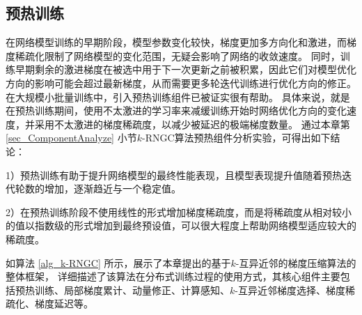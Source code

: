 \documentclass{xdupgthesis}
\begin{document}
\subsection{预热训练}
在网络模型训练的早期阶段，模型参数变化较快，梯度更加多方向化和激进，而梯度稀疏化限制了网络模型的变化范围，无疑会影响了网络的收敛速度。
同时，训练早期剩余的激进梯度在被选中用于下一次更新之前被积累，因此它们对模型优化方向的影响可能会超过最新梯度，从而需要更多轮迭代训练进行优化方向的修正。
在大规模小批量训练中，引入预热训练组件已被证实很有帮助\cite{goyal2017accurate}。
具体来说，就是在预热训练期间，使用不太激进的学习率来减缓训练开始时网络优化方向的变化速度，并采用不太激进的梯度稀疏度，以减少被延迟的极端梯度数量。
通过本章第 \ref{sec_ComponentAnalyze} 小节$k$-RNGC算法预热组件分析实验，可得出如下结论：

1）预热训练有助于提升网络模型的最终性能表现，且模型表现提升值随着预热迭代轮数的增加，逐渐趋近与一个稳定值。

2）在预热训练阶段不使用线性的形式增加梯度稀疏度，而是将稀疏度从相对较小的值以指数级的形式增加到最终预设值，可以很大程度上帮助网络模型适应较大的稀疏度。

如算法 \ref*{alg_k-RNGC} 所示，展示了本章提出的基于$k$-互异近邻的梯度压缩算法的整体框架，
详细描述了该算法在分布式训练过程的使用方式，其核心组件主要包括预热训练、局部梯度累计、动量修正、计算感知、$k$-互异近邻梯度选择、梯度稀疏化、梯度延迟等。
\end{document}
